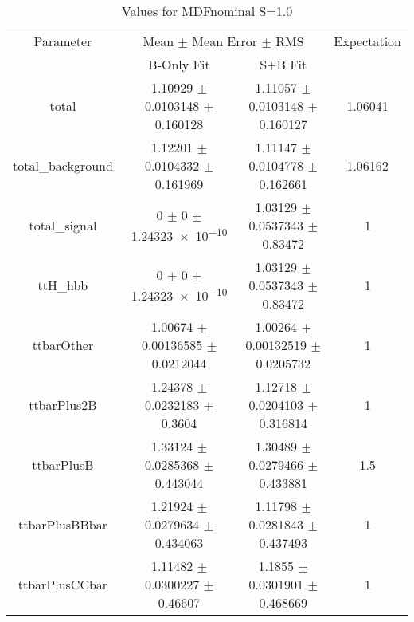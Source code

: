 \begin{table}
\centering
\caption{Values for MDFnominal S=1.0}
\begin{tabular}{cccc}
\toprule
Parameter & \multicolumn{2}{c}{Mean $\pm$ Mean Error $\pm$ RMS} & Expectation\\
 & B-Only Fit & S+B Fit & \\
\midrule
total & \num{1.10929} $\pm$ \num{0.0103148} $\pm$ \num{0.160128} & \num{1.11057} $\pm$ \num{0.0103148} $\pm$ \num{0.160127} & \num{1.06041}\\
total\_background & \num{1.12201} $\pm$ \num{0.0104332} $\pm$ \num{0.161969} & \num{1.11147} $\pm$ \num{0.0104778} $\pm$ \num{0.162661} & \num{1.06162}\\
total\_signal & \num{0} $\pm$ \num{0} $\pm$ \num{1.24323e-10} & \num{1.03129} $\pm$ \num{0.0537343} $\pm$ \num{0.83472} & \num{1}\\
ttH\_hbb & \num{0} $\pm$ \num{0} $\pm$ \num{1.24323e-10} & \num{1.03129} $\pm$ \num{0.0537343} $\pm$ \num{0.83472} & \num{1}\\
ttbarOther & \num{1.00674} $\pm$ \num{0.00136585} $\pm$ \num{0.0212044} & \num{1.00264} $\pm$ \num{0.00132519} $\pm$ \num{0.0205732} & \num{1}\\
ttbarPlus2B & \num{1.24378} $\pm$ \num{0.0232183} $\pm$ \num{0.3604} & \num{1.12718} $\pm$ \num{0.0204103} $\pm$ \num{0.316814} & \num{1}\\
ttbarPlusB & \num{1.33124} $\pm$ \num{0.0285368} $\pm$ \num{0.443044} & \num{1.30489} $\pm$ \num{0.0279466} $\pm$ \num{0.433881} & \num{1.5}\\
ttbarPlusBBbar & \num{1.21924} $\pm$ \num{0.0279634} $\pm$ \num{0.434063} & \num{1.11798} $\pm$ \num{0.0281843} $\pm$ \num{0.437493} & \num{1}\\
ttbarPlusCCbar & \num{1.11482} $\pm$ \num{0.0300227} $\pm$ \num{0.46607} & \num{1.1855} $\pm$ \num{0.0301901} $\pm$ \num{0.468669} & \num{1}\\
\bottomrule
\end{tabular}
\end{table}